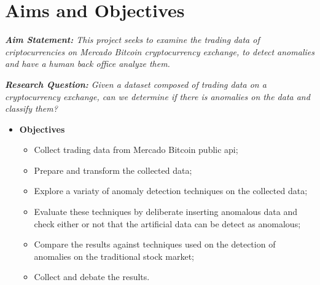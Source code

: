 \section{Aims and Objectives}
\textit{\textbf{Aim Statement:} This project seeks to examine the trading data of criptocurrencies on Mercado Bitcoin cryptocurrency exchange, to detect anomalies and have a
human back office analyze them.}

\textit{\textbf{Research Question:} Given a dataset composed of trading data on a cryptocurrency exchange, can we
determine if there is anomalies on the data and classify them?}

\begin{itemize}
    \item[] \textbf{Objectives}
    \begin{itemize}
        \item Collect trading data from Mercado Bitcoin public api;
        \item Prepare and transform the collected data;
        \item Explore a variaty of anomaly detection techniques on the collected data;
        \item Evaluate these techniques by deliberate inserting anomalous data and check either or not that the
        artificial data can be detect as anomalous;
        \item Compare the results against techniques used on the detection of anomalies on the traditional stock market;
        \item Collect and debate the results.
    \end{itemize}
\end{itemize}